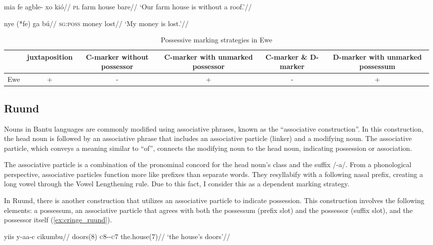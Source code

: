 \ex
\label{ewe_pronoun_example}
\begingl
\gla mia fe agble- xo kió//
\textsc{pl} \Poss{} farm house bare//
\glft `Our farm house is without a roof.'//
\endgl
\xe

\ex
\label{ewe_pronoun_example2}
\begingl
\gla nye (*fe) ga bú//
\textsc{sg:poss} \Poss{} money lost//
\glft `My money is lost.'//
\endgl
\xe


\begin{table}[h!]
	\centering
	\small
	\begin{tabular}{@{}cccccc@{}}
		\toprule
		& juxtaposition & \parbox{2.5cm}{C-marker without possessor} & \parbox{2.75cm}{C-marker with unmarked possessor} & \parbox{1.75cm}{C-marker \& D-marker} & \parbox{3cm}{D-marker with unmarked possessum} \\ \midrule
		Ewe & + & - & + & - & + \\ \bottomrule
	\end{tabular}
	\caption{Possessive marking strategies in Ewe}
\end{table}


\subsection{Ruund}

Nouns in Bantu languages are commonly modified using associative phrases, known as the ``associative construction''. In this construction, the head noun is followed by an associative phrase that includes an associative particle (linker) and a modifying noun. The associative particle, which conveys a meaning similar to ``of'', connects the modifying noun to the head noun, indicating possession or association.

The associative particle is a combination of the pronominal concord for the head noun's class and the suffix /-a/. From a phonological perspective, associative particles function more like prefixes than separate words. They resyllabify with a following nasal prefix, creating a long vowel through the Vowel Lengthening rule. Due to this fact, I consider this as a dependent marking strategy.

In Ruund, there is another construction that utilizes an associative particle to indicate possession. This construction involves the following elements: a possessum, an associative particle that agrees with both the possessum (prefix slot) and the possessor (suffix slot), and the possessor itself (\ref{ex:cringe_ruund}).

\ex\label{ex:cringe_ruund}
\begingl
\gla yiis y-aa-c cikumbu//
\glb doors(8) \textsc{c8}-\Lnk-\textsc{c7} the.house(7)//
\glft `the house's doors'//
\endgl
\xe

